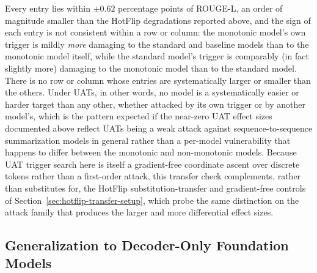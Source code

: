 \documentclass{article}
\theoremstyle{plain}
\theoremstyle{definition}
\theoremstyle{remark}
\begin{document}
\begin{table}[t]
\caption{UAT trigger transfer matrix (seed = 42; $n = 100$). Entry $(i,j)$ is the ROUGE-L delta (percentage points, attacked minus clean) when the trigger learned on model $i$ is evaluated against model $j$. Diagonal entries (bold) are same-model attacks.}
\label{tab:transfer-matrix}
\vskip 0.1in
\centering
{}
\vskip -0.1in
\end{table}

Every entry lies within $\pm 0.62$ percentage points of ROUGE-L, an order of magnitude smaller than the HotFlip degradations reported above, and the sign of each entry is not consistent within a row or column: the monotonic model's own trigger is mildly \emph{more} damaging to the standard and baseline models than to the monotonic model itself, while the standard model's trigger is comparably (in fact slightly more) damaging to the monotonic model than to the standard model. There is no row or column whose entries are systematically larger or smaller than the others. Under UATs, in other words, no model is a systematically easier or harder target than any other, whether attacked by its own trigger or by another model's, which is the pattern expected if the near-zero UAT effect sizes documented above reflect UATs being a weak attack against sequence-to-sequence summarization models in general rather than a per-model vulnerability that happens to differ between the monotonic and non-monotonic models. Because UAT trigger search here is itself a gradient-free coordinate ascent over discrete tokens rather than a first-order attack, this transfer check complements, rather than substitutes for, the HotFlip substitution-transfer and gradient-free controls of Section~\ref{sec:hotflip-transfer-setup}, which probe the same distinction on the attack family that produces the larger and more differential effect sizes.

\subsection{Generalization to Decoder-Only Foundation Models}
\label{sec:results-pythia}
\end{document}
